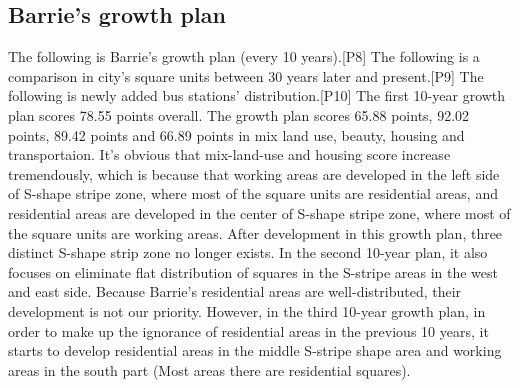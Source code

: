 \subsection{Barrie's growth plan}
The following is Barrie's growth plan (every 10 years).[P8]
The following is a comparison in city's square units between 30 years later and present.[P9]
The following is newly added bus stations' distribution.[P10]
The first 10-year growth plan scores 78.55 points overall. The growth plan scores 65.88 points, 92.02 points, 89.42 points and 66.89 points in mix land use, beauty, housing and transportaion. It's obvious that mix-land-use and housing score increase tremendously, which is because that working areas are developed in the left side of S-shape stripe zone, where most of the square units are residential areas, and residential areas are developed in the center of S-shape stripe zone, where most of the square units are working areas. After development in this growth plan, three distinct S-shape strip zone no longer exists. In the second 10-year plan, it also focuses on eliminate flat distribution of squares in the S-stripe areas in the west and east side. Because Barrie's residential areas are well-distributed, their development is not our priority. However, in the third 10-year growth plan, in order to make up the ignorance of residential areas in the previous 10 years, it starts to develop residential areas in the middle S-stripe shape area and working areas in the south part (Most areas there are residential squares).
